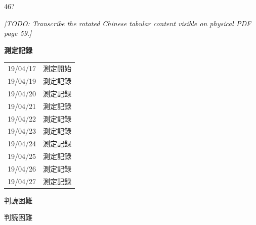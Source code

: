 \documentclass[UTF8,10pt,a4paper,fontset=fandol]{ctexart}
\newcommand{\fieldvalue}[1]{#1}
\newcommand{\handwritten}[1]{#1}
\begin{document}
\handwritten{46?}

\newpage

\begin{center}
\textit{[TODO: Transcribe the rotated Chinese tabular content visible on physical PDF page 59.]}
\end{center}

\newpage

\begin{center}
\textbf{測定記録}
\end{center}

\begin{flushright}
\begin{tabular}{ll}
19/04/17 & 測定開始\\
19/04/19 & 測定記録\\
19/04/20 & 測定記録\\
19/04/21 & 測定記録\\
19/04/22 & 測定記録\\
19/04/23 & 測定記録\\
19/04/24 & 測定記録\\
19/04/25 & 測定記録\\
19/04/26 & 測定記録\\
19/04/27 & 測定記録\\
\end{tabular}
\end{flushright}

\vspace{1em}

\fieldvalue{\handwritten{判読困難}}

\fieldvalue{\handwritten{判読困難}}

\vspace{1em}
\end{document}

